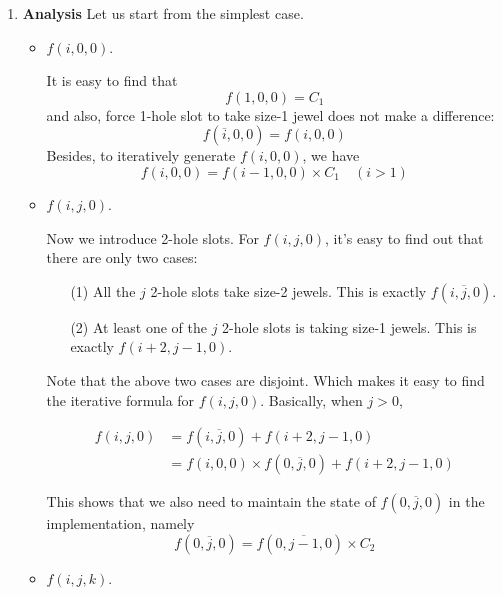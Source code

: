 \documentclass[a4paper,12pt]{article}
\begin{document}
\begin{enumerate}
\item \textbf{Analysis}
  Let us start from the simplest case. 
  \begin{itemize}
  \item $f(i, 0, 0)$. 


    It is easy to find that 
    \begin{equation}
      \label{eq:f100}
      f(1, 0, 0) = C_1
    \end{equation}
    and also, force 1-hole slot to take size-1 jewel does not make a
    difference:
    \begin{equation}
      f(\overline{i}, 0, 0) = f(i, 0, 0)
    \end{equation}
    Besides, to iteratively generate $f(i, 0, 0)$, we have
    \begin{equation}
      f(i, 0, 0) = f(i-1, 0, 0) \times C_1 \quad (i > 1)
    \end{equation}


  \item $f(i, j, 0)$.
    
    Now we introduce 2-hole slots. For $f(i, j, 0)$, it's easy to find
    out that there are only two cases:
    \begin{itemize}
    \item[(1)] All the $j$ 2-hole slots take size-2 jewels. This is
      exactly $f(i, \overline{j}, 0)$.
    \item[(2)] At least one of the $j$ 2-hole slots is taking size-1
      jewels. This is exactly $f(i + 2, j-1, 0)$.
    \end{itemize}

    Note that the above two cases are disjoint. Which makes it easy to
    find the iterative formula for $f(i, j, 0)$. Basically, when $j >
    0$,
    
    \begin{align}
      f(i, j, 0) &= f(i, \overline{j}, 0) + f(i + 2, j -1 , 0) \\
      &= f(i, 0, 0) \times f(0, \overline{j}, 0) + f(i + 2, j - 1, 0) 
    \end{align}
    
    This shows that we also need to maintain the state of $f(0,
    \overline{j}, 0)$ in the implementation, namely
    \begin{equation}
      \label{eq:f0j0}
      f(0, \overline{j}, 0) = f(0, \overline{j - 1}, 0) \times C_2
    \end{equation}

  \item $f(i, j, k)$.


\end{itemize}
\end{enumerate}
\end{document}
